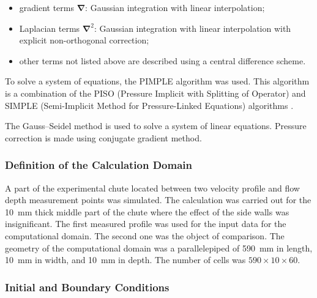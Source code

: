 \documentclass[sensors,article,submit,moreauthors,pdftex]{Definitions/mdpi}
\begin{document}
\begin{itemize}
	\item gradient terms $\boldsymbol{\nabla}$: Gaussian integration with linear interpolation;
	\item Laplacian terms $\boldsymbol{\nabla}^2$: Gaussian integration with linear interpolation with explicit non-orthogonal correction;
	\item other terms not listed above are described using a central difference scheme.
\end{itemize}

To solve a system of equations, the PIMPLE \cite{Holzmann2019, Yin2003} algorithm was used. This algorithm is a combination of the PISO (Pressure Implicit with Splitting of Operator) \cite{Issa1986_2} and SIMPLE (Semi-Implicit Method for Pressure-Linked Equations) algorithms \cite{Issa1986_1}.

The Gauss–Seidel method is used to solve a system of linear equations. Pressure correction is made using conjugate gradient method.

\subsubsection{Definition of the Calculation Domain}

A part of the experimental chute located between two velocity profile and flow depth measurement points was simulated. The calculation was carried out for the 10~mm thick middle part of the chute where the effect of the side walls was insignificant. The first measured profile was used for the input data for the computational domain. The second one was the object of comparison. The geometry of the computational domain was a parallelepiped of 590~mm in length, 10~mm in width, and 10~mm in depth. The number of cells was $590 \times 10 \times 60$.

\subsubsection{Initial and Boundary Conditions}
\end{document}
